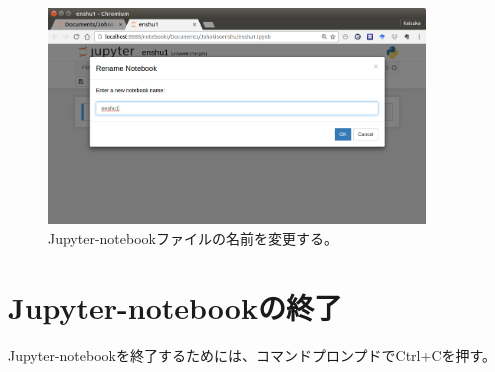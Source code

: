 \begin{figure}
	\centering
	\includegraphics[width=10cm]{TeX_files/fig_python_install/Jupyter1.png}
	\caption{
		\label{fig:Jupyter1}
		Jupyter-notebookファイルの名前を変更する。
	}
\end{figure}

\section{Jupyter-notebookの終了}
Jupyter-notebookを終了するためには、コマンドプロンプドでCtrl+Cを押す。